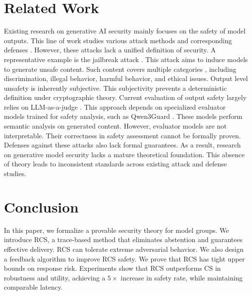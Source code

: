 \documentclass[11pt]{article}
\begin{document}
\section{Related Work}

Existing research on generative AI security mainly focuses on the safety of model outputs. This line of work studies various attack methods \citep{li2024badedit, li2025one} and corresponding defenses \citep{zhang2025exploiting}. However, these attacks lack a unified definition of security. A representative example is the jailbreak attack \citep{mehrotra2024tree, zhang2025jbshield, yu2024don, wang-etal-2025-diffusionattacker}. This attack aims to induce models to generate unsafe content. Such content covers multiple categories \citep{guo2025deepseeknature}, including discrimination, illegal behavior, harmful behavior, and ethical issues. Output level unsafety is inherently subjective. This subjectivity prevents a deterministic definition under cryptographic theory. Current evaluation of output safety largely relies on LLM-as-a-judge \citep{li-etal-2025-generation}. This approach depends on specialized evaluator models trained for safety analysis, such as Qwen3Guard \citep{zhao2025qwen3guard}. These models perform semantic analysis on generated content. However, evaluator models are not interpretable. Their correctness in safety assessment cannot be formally proven. Defenses against these attacks also lack formal guarantees. As a result, research on generative model security lacks a mature theoretical foundation. This absence of theory leads to inconsistent standards across existing attack and defense studies. 




\section{Conclusion}
In this paper, we formalize a provable security theory for model groups. We introduce RCS, a trace-based method that eliminates abstention and guarantees effective delivery. RCS can tolerate extreme adversarial behavior. We also design a feedback algorithm to improve RCS safety. We prove that RCS has tight upper bounds on response risk. Experiments show that RCS outperforms CS in robustness and utility, achieving a $5\times$ increase in safety rate, while maintaining comparable latency.
\end{document}
